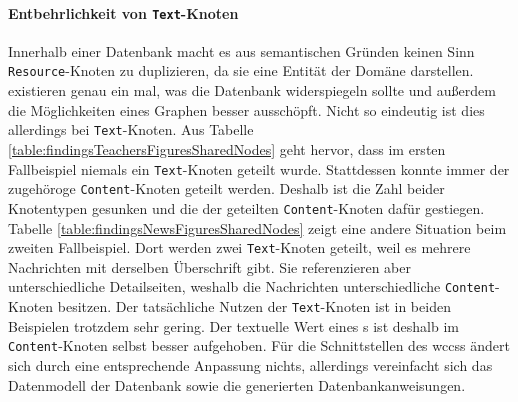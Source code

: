     \paragraph{Entbehrlichkeit von \texttt{Text}-Knoten}
    Innerhalb einer Datenbank macht es aus semantischen Gründen keinen Sinn
    \texttt{Resource}-Knoten zu duplizieren,
    da sie eine Entität der Domäne darstellen.
    {\resources} existieren genau ein mal, was die Datenbank widerspiegeln sollte
    und außerdem die Möglichkeiten eines Graphen besser ausschöpft.
    Nicht so eindeutig ist dies allerdings bei \texttt{Text}-Knoten.
    Aus Tabelle \ref{table:findingsTeachersFiguresSharedNodes} geht hervor,
    dass im ersten Fallbeispiel niemals ein \texttt{Text}-Knoten geteilt wurde.
    Stattdessen konnte immer der zugehöroge \texttt{Content}-Knoten geteilt werden.
    Deshalb ist die Zahl beider Knotentypen gesunken und die der geteilten
    \texttt{Content}-Knoten dafür gestiegen.
    Tabelle \ref{table:findingsNewsFiguresSharedNodes}
    zeigt eine andere Situation beim zweiten Fallbeispiel.
    Dort werden zwei \texttt{Text}-Knoten geteilt,
    weil es mehrere Nachrichten mit derselben Überschrift gibt.
    Sie referenzieren aber unterschiedliche Detailseiten,
    weshalb die Nachrichten unterschiedliche \texttt{Content}-Knoten besitzen.
    Der tatsächliche Nutzen der \texttt{Text}-Knoten ist in beiden Beispielen trotzdem sehr gering.
    Der textuelle Wert eines {\contentFeature}s ist deshalb im \texttt{Content}-Knoten selbst besser aufgehoben.
    Für die Schnittstellen des \glspl{wccs} ändert sich durch eine entsprechende Anpassung nichts,
    allerdings vereinfacht sich das Datenmodell der Datenbank sowie
    die generierten Datenbankanweisungen.

